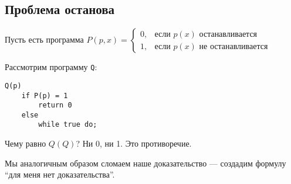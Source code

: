 \subsection{Проблема останова}

Пусть есть программа \(P(p, x) = \begin{cases}
    0, & \text{если } p(x) \text{ останавливается}    \\
    1, & \text{если } p(x) \text{ не останавливается}
\end{cases}\)

Рассмотрим программу \texttt{Q}:
\begin{verbatim}
Q(p)
    if P(p) = 1
        return 0
    else
        while true do;
\end{verbatim}

Чему равно \(Q(Q)\)? Ни 0, ни 1. Это противоречие.

Мы аналогичным образом сломаем наше доказательство --- создадим формулу ``для меня нет доказательства''.

